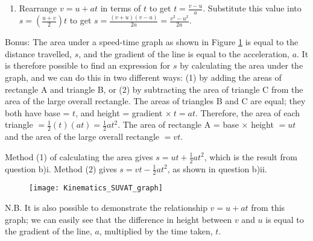 \begin{problem}
{\begin{enumerate}
\begin{enumerate}
		\item Rearrange $v = u + at$ in terms of $t$ to get $t = \frac{v - u}{a}$. Substitute this value into $s = \left(\frac{u + v}{2}\right)t$ to get $s = \frac{(v + u)(v - u)}{2a} = \frac{v^{2} - u^{2}}{2a}$.
	\end{enumerate}
	Bonus: The area under a speed-time graph as shown in Figure \ref{fig:Kinematics_SUVAT_graph} is equal to the distance travelled, $s$, and the gradient of the line is equal to the acceleration, $a$. It is therefore possible to find an expression for $s$ by calculating the area under the graph, and we can do this in two different ways: (1) by adding the areas of rectangle A and triangle B, or (2) by subtracting the area of triangle C from the area of the large overall rectangle. The areas of triangles B and C are equal; they both have base = $t$, and height = gradient $\times~t = at$. Therefore, the area of each triangle $= \frac{1}{2}(t)(at) = \frac{1}{2}at^{2}$. The area of rectangle A = base $\times$ height $= ut$ and the area of the large overall rectangle $= vt$.

Method (1) of calculating the area gives $s = ut + \frac{1}{2}at^{2}$, which is the result from question b)i. Method (2) gives $s = vt - \frac{1}{2}at^{2}$, as shown in question b)ii.
\begin{figure}[h]
\centering
\texttt{[image: Kinematics\_SUVAT\_graph]}
\caption{}
\label{fig:Kinematics_SUVAT_graph}
\end{figure}	

N.B. It is also possible to demonstrate the relationship $v = u + at$ from this graph; we can easily see that the difference in height between $v$ and $u$ is equal to the gradient of the line, $a$, multiplied by the time taken, $t$.
\end{enumerate}
 }
\end{problem}